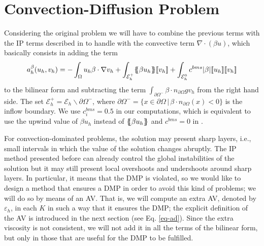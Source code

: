 \section{Convection-Diffusion Problem}\label{s-cd}

Considering the original problem  we will have to combine the previous terms with the IP terms described in \cite{brezzi_discontinuous_2004} to  handle with the convective term $\nabla \cdot(\beta u)$, which basically consists in adding the term 
\begin{align}
\label{eq-betaIP}
a_h^\beta(u_h,v_h) = - \int_\Omega   u_{h} \beta \cdot \nabla v_{h} + \int_{\mathcal{E}_h^+}  \mean{\beta u_h}\jump{ v_{h}} + \int_{\mathcal{E}_h^0} c^{bms} |\beta | \jump{u_h}\jump{v_h}
\end{align} to the bilinear form and subtracting the term $\int_{\partial \Omega^-} \beta \cdot n_{\partial\Omega}g v_h $ from the right hand side. The set $\mathcal{E}_h^+=\mathcal{E}_h\backslash\partial\Omega^-$, where  $\partial\Omega^-=\{x\in\partial\Omega \, | \, \beta\cdot n_{\partial \Omega}(x) <0\}$ is the inflow boundary.  We use $c_i^{bms} = 0.5$ in our computations, {  which is equivalent to use the upwind value of $\beta u_h$ instead of $\{\! \!\{ \beta u_h\}\! \!\}$ and $c^{bms} =0$ in }.
 
 For convection-dominated problems, the solution may present sharp layers, i.e., small intervals in which the value of the solution changes abruptly. The IP method presented before can already control the global instabilities of the solution but it may still present local overshoots and undershoots around sharp layers. In particular, it means that the DMP is violated, so we would like to design a method that ensures a DMP in order to avoid this kind of problems; we will do so by means of an AV. That is, we will compute an extra AV, denoted by $\varepsilon_h$, in each $K$ in such a way that it ensures the DMP; { the explicit definition of the AV is introduced in the next section (see Eq. \ref{eq-ad})}. { Since the extra viscosity is not consistent, we will not add it in all the terms of the bilinear form, but only in those that are useful for the DMP to be fulfilled}.
 
